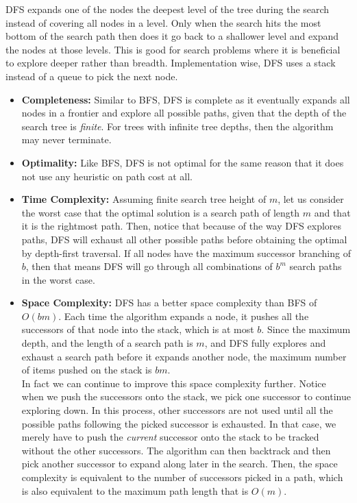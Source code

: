 \documentclass[12pt]{article}
\begin{document}
DFS expands one of the nodes the deepest level of the tree during the search instead of covering all nodes in a level. Only when the search hits the most bottom of the search path then does it go back to a shallower level and expand the nodes at those levels. This is good for search problems where it is beneficial to explore deeper rather than breadth. Implementation wise, DFS uses a stack instead of a queue to pick the next node.


\begin{itemize}
\item \textbf{Completeness:} Similar to BFS, DFS is complete as it eventually expands all nodes in a frontier and explore all possible paths, given that the depth of the search tree is \textit{finite}. For trees with infinite tree depths, then the algorithm may never terminate. 

\item \textbf{Optimality:} Like BFS, DFS is not optimal for the same reason that it does not use any heuristic on path cost at all.

\item \textbf{Time Complexity:} Assuming finite search tree height of $m$, let us consider the worst case that the optimal solution is a search path of length $m$ and that it is the rightmost path. Then, notice that because of the way DFS explores paths, DFS will exhaust all other possible paths before obtaining the optimal by depth-first traversal. If all nodes have the maximum successor branching of $b$, then that means DFS will go through all combinations of $b^m$ search paths in the worst case.

\item \textbf{Space Complexity:} DFS has a better space complexity than BFS of $O(bm)$. Each time the algorithm expands a node, it pushes all the successors of that node into the stack, which is at most $b$. Since the maximum depth, and the length of a search path is $m$, and DFS fully explores and exhaust a search path before it expands another node, the maximum number of items pushed on the stack is $bm$. \\

In fact we can continue to improve this space complexity further. Notice when we push the successors onto the stack, we pick one successor to continue exploring down. In this process, other successors are not used until all the possible paths following the picked successor is exhausted. In that case, we merely have to push the \textit{current} successor onto the stack to be tracked without the other successors. The algorithm can then backtrack and then pick another successor to expand along later in the search. Then, the space complexity is equivalent to the number of successors picked in a path, which is also equivalent to the maximum path length that is $O(m)$.
\end{itemize}
\end{document}
